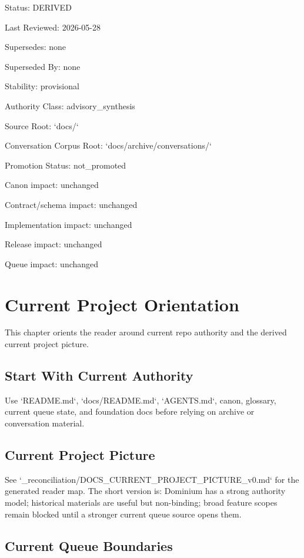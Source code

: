 \documentclass[11pt,a4paper]{report}
\begin{document}
Status: DERIVED

Last Reviewed: 2026-\allowbreak{}05-\allowbreak{}28

Supersedes: none

Superseded By: none

Stability: provisional

Authority Class: advisory\_synthesis

Source Root: `docs/\allowbreak{}`

Conversation Corpus Root: `docs/\allowbreak{}archive/\allowbreak{}conversations/\allowbreak{}`

Promotion Status: not\_promoted

Canon impact: unchanged

Contract/\allowbreak{}schema impact: unchanged

Implementation impact: unchanged

Release impact: unchanged

Queue impact: unchanged


\chapter{Current Project Orientation}

This chapter orients the reader around current repo authority and the derived current project picture.\allowbreak{}


\section{Start With Current Authority}

Use `README.\allowbreak{}md`, `docs/\allowbreak{}README.\allowbreak{}md`, `AGENTS.\allowbreak{}md`, canon, glossary, current queue state, and foundation docs before relying on archive or conversation material.\allowbreak{}


\section{Current Project Picture}

See `\_reconciliation/\allowbreak{}DOCS\_CURRENT\_PROJECT\_PICTURE\_v0.\allowbreak{}md` for the generated reader map.\allowbreak{} The short version is: Dominium has a strong authority model; historical materials are useful but non-\allowbreak{}binding; broad feature scopes remain blocked until a stronger current queue source opens them.\allowbreak{}


\section{Current Queue Boundaries}
\end{document}
